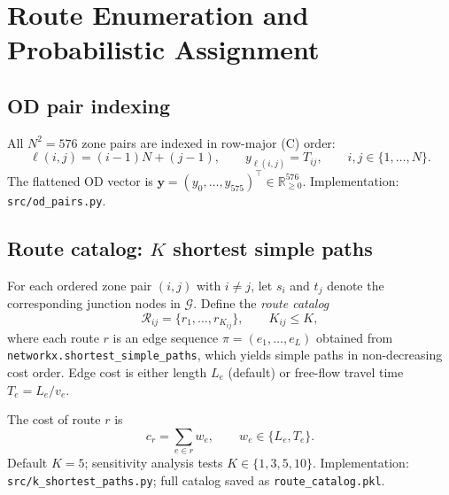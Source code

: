 \documentclass[11pt,a4paper]{report}
\newcommand{\mathbfy}{\mathbf{y}}
\begin{document}
\chapter{Route Enumeration and Probabilistic Assignment}
\label{ch:routes}

\section{OD pair indexing}

All $N^2=576$ zone pairs are indexed in row-major (C) order:
\begin{equation}
    \ell(i,j)=(i-1)N+(j-1), \qquad y_{\ell(i,j)}=T_{ij}, \qquad i,j\in\{1,\ldots,N\}.
    \label{eq:od_index}
\end{equation}
The flattened OD vector is $\mathbfy=(y_0,\ldots,y_{575})^\top\in\mathbb{R}_{\ge 0}^{576}$. Implementation: \texttt{src/od\_pairs.py}.

\section{Route catalog: $K$ shortest simple paths}

For each ordered zone pair $(i,j)$ with $i\neq j$, let $s_i$ and $t_j$ denote the corresponding junction nodes in $\mathcal{G}$. Define the \emph{route catalog}
\begin{equation}
    \mathcal{R}_{ij} = \bigl\{ r_1,\ldots,r_{K_{ij}} \bigr\}, \qquad K_{ij}\le K,
\end{equation}
where each route $r$ is an edge sequence $\pi=(e_1,\ldots,e_L)$ obtained from \texttt{networkx.shortest\_simple\_paths}, which yields simple paths in non-decreasing cost order. Edge cost is either length $L_e$ (default) or free-flow travel time $T_e=L_e/v_e$.

The cost of route $r$ is
\begin{equation}
    c_r = \sum_{e\in r} w_e, \qquad w_e \in \{L_e, T_e\}.
    \label{eq:route_cost}
\end{equation}
Default $K=5$; sensitivity analysis tests $K\in\{1,3,5,10\}$. Implementation: \texttt{src/k\_shortest\_paths.py}; full catalog saved as \texttt{route\_catalog.pkl}.
\end{document}
